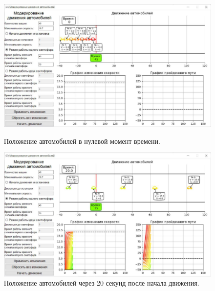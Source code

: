 \documentclass[12pt, a4paper]{extarticle}
\numberwithin{equation}{section}
\numberwithin{figure}{section}
\begin{document}
\begin{figure}[h!]
	\begin{center}
		\begin{minipage}[h]{0.48\linewidth}
			\includegraphics[width=1\linewidth]
			{Images/screens/second_mode_1}
			\caption{Положение автомобилей в нулевой момент времени.} 
			\label{second_mode_1}
		\end{minipage}
		\hfill 
		\begin{minipage}[h]{0.48\linewidth}
			\includegraphics[width=1\linewidth]
			{Images/screens/second_mode_2}
			\caption{Положение автомобилей через 20 секунд после начала движения.}
			\label{second_mode_2}
		\end{minipage}
	\end{center}
\end{figure}
\end{document}
